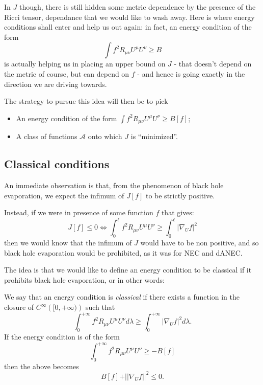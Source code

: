 	In \(J\) though, there is still hidden some metric dependence by the presence of the Ricci tensor, dependance that we would like to wash away. Here is where energy conditions shall enter and help us out again: in fact, an energy condition of the form 
	\[
	\int f^2 R_{\mu\nu}U^{\mu}U^{\nu} \ge B	
	\]
	is actually helping us in placing an upper bound on \(J\) - that doesn't depend on the metric of course, but can depend on \(f\) - and hence is going exactly in the direction we are driving towards.

	The strategy to pursue this idea will then be to pick
	\begin{itemize}
		\item An energy condition of the form \(\int f^2 R_{\mu\nu}U^{\mu}U^{\nu} \ge B[f]\);
		\item A class of functions \(\mathcal{A}\) onto which \(J\) is ``minimized''.
	\end{itemize}

	\subsection{Classical conditions}
	An immediate observation is that, from the phenomenon of black hole evaporation, we expect the infimum of \(J[f]\) to be strictly positive.

	Instead, if we were in presence of some function \(f\) that gives:
	\[
	J[f] \le 0	\iff \int_0^{\ell} f^2 R_{\mu\nu}U^{\mu}U^{\nu} \ge \int_0^{\ell} \vert \nabla_U f\vert^2
	\]
	then we would know that the infimum of \(J\) would have to be non positive, and so black hole evaporation would be prohibited, as it was for NEC and dANEC.

	The idea is that we would like to define an energy condition to be classical if it prohibits black hole evaporation, or in other words:
	\begin{definition}
		\label{def:classical-energy-condition}
		We say that an energy condition is \emph{classical} if there exists a function in the closure of \(C^{\infty}\left([0, +\infty)\right)\) such that
		\[
			\int_0^{+\infty} f^2 R_{\mu\nu}U^{\mu}U^{\nu} d\lambda\ge \int_0^{+\infty} \vert \nabla_U f\vert^2 d\lambda.	
		\]
		If the energy condition is of the form
		\[
			\int_0^{+\infty} f^2 R_{\mu\nu}U^{\mu}U^{\nu} \ge -B[f]	
		\]
		then the above becomes
		\begin{equation}
			\label{eq:definition-classical-condition}
			B[f] + \vert\vert \nabla_U f \vert\vert^2 \le 0.
		\end{equation}
	\end{definition}

